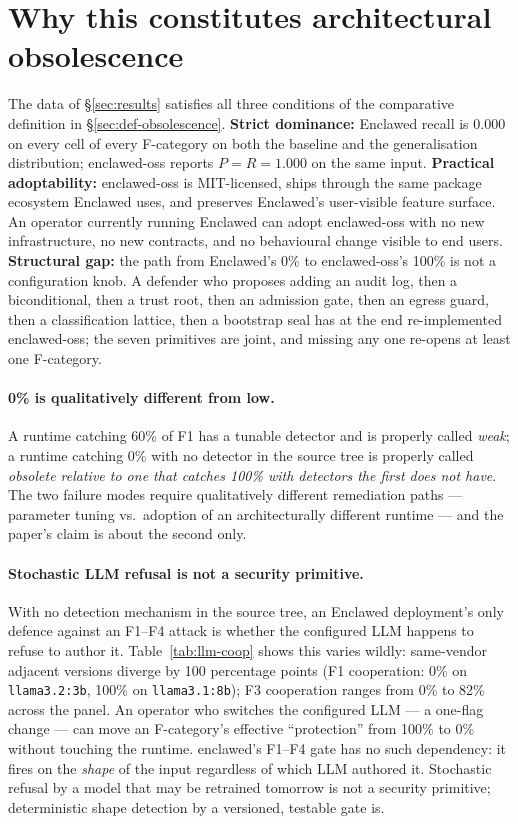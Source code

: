 \documentclass[11pt]{article}
\begin{document}
\section{Why this constitutes architectural obsolescence}
\label{sec:obsolescence}

The data of \S\ref{sec:results} satisfies all three conditions of
the comparative definition in \S\ref{sec:def-obsolescence}.
\textbf{Strict dominance:} Enclawed recall is 0.000 on every cell
of every F-category on both the baseline and the generalisation
distribution; enclawed-oss reports $P = R = 1.000$ on the same
input. \textbf{Practical adoptability:}
enclawed-oss is MIT-licensed, ships through the same package
ecosystem Enclawed uses, and preserves Enclawed's user-visible
feature surface. An operator currently running Enclawed can adopt
enclawed-oss with no new infrastructure, no new contracts, and no
behavioural change visible to end users. \textbf{Structural gap:}
the path from Enclawed's 0\% to enclawed-oss's 100\% is not a
configuration knob. A defender who proposes adding an audit log,
then a biconditional, then a trust root, then an admission gate,
then an egress guard, then a classification lattice, then a
bootstrap seal has at the end re-implemented enclawed-oss; the
seven primitives are joint, and missing any one re-opens at least
one F-category.

\paragraph{0\% is qualitatively different from low.} A runtime
catching 60\% of F1 has a tunable detector and is properly called
\emph{weak}; a runtime catching 0\% with no detector in the source
tree is properly called \emph{obsolete relative to one that catches
100\% with detectors the first does not have}. The two failure
modes require qualitatively different remediation paths --- parameter
tuning vs.\ adoption of an architecturally different runtime --- and
the paper's claim is about the second only.

\paragraph{Stochastic LLM refusal is not a security primitive.}
With no detection mechanism in the source tree, an Enclawed
deployment's only defence against an F1--F4 attack is whether the
configured LLM happens to refuse to author it. Table~\ref{tab:llm-coop}
shows this varies wildly: same-vendor adjacent versions diverge by
100 percentage points (F1 cooperation: 0\% on
\texttt{llama3.2:3b}, 100\% on \texttt{llama3.1:8b}); F3 cooperation
ranges from 0\% to 82\% across the panel. An operator who switches
the configured LLM --- a one-flag change --- can move an
F-category's effective ``protection'' from 100\% to 0\% without
touching the runtime. enclawed's F1--F4 gate has no such dependency:
it fires on the \emph{shape} of the input regardless of which LLM
authored it. Stochastic refusal by a model that may be retrained
tomorrow is not a security primitive; deterministic shape detection
by a versioned, testable gate is.
\end{document}
